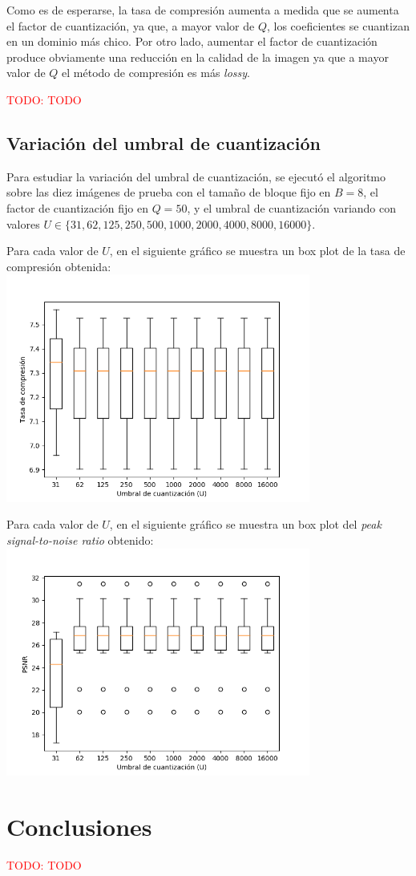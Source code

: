 \documentclass{article}
\newcommand{\set}[1]{\{#1\}}
\newcommand{\TODO}[1]{\textcolor{red}{TODO: #1}}
\begin{document}
Como es de esperarse, la tasa de compresión aumenta a medida que
se aumenta el factor de cuantización, ya que, a mayor valor de $Q$,
los coeficientes se cuantizan en un dominio más chico.
Por otro lado, aumentar el factor de cuantización produce obviamente
una reducción en la calidad de la imagen ya que a mayor valor de $Q$
el método de compresión es más {\em lossy}.

\TODO{TODO}

\newpage
\subsection{Variación del umbral de cuantización}

Para estudiar la variación del umbral de cuantización, se ejecutó el
algoritmo sobre las diez imágenes de prueba con el
tamaño de bloque fijo en $B = 8$,
el factor de cuantización fijo en $Q = 50$,
y el umbral de cuantización variando con valores
$U \in \set{31, 62, 125, 250, 500, 1000, 2000, 4000, 8000, 16000}$.

Para cada valor de $U$, en el siguiente gráfico se muestra un
box plot de la tasa de compresión obtenida:\\
\includegraphics[width=10cm]{../imgs/output/gray_plots/u_rate.png}

Para cada valor de $U$, en el siguiente gráfico se muestra un
box plot del {\em peak signal-to-noise ratio} obtenido:\\
\includegraphics[width=10cm]{../imgs/output/gray_plots/u_psnr.png}


\section{Conclusiones}

\TODO{TODO}
\end{document}
